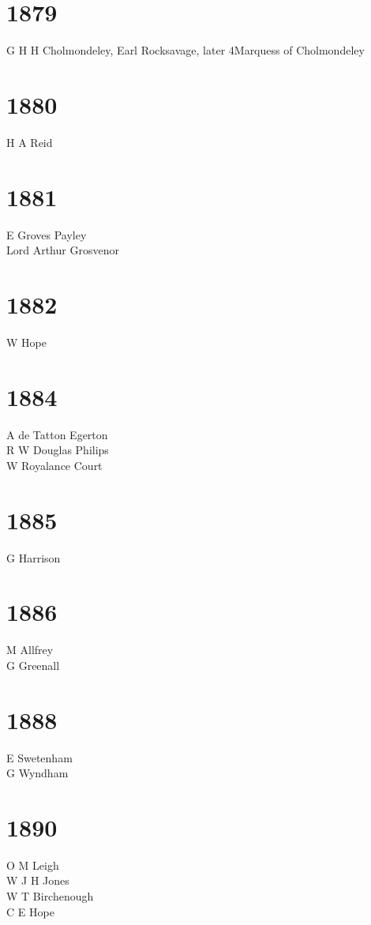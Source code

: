 \begin{multicols}{2}
  \section*{1879}
  G H H Cholmondeley, Earl Rocksavage, later 4\nth Marquess of Cholmondeley \\
  \section*{1880}
  H A Reid \\
  \section*{1881}
  E Groves Payley \\
  Lord Arthur Grosvenor \\
  \section*{1882}
  W Hope \\
  \section*{1884}
  A de Tatton Egerton \\
  R W Douglas Philips \\
  W Royalance Court \\
  \section*{1885}
  G Harrison \\
  \section*{1886}
  M Allfrey \\
  G Greenall \\
  \section*{1888}
  E Swetenham \\
  G Wyndham \\
  \section*{1890}
  O M Leigh \\
  W J H Jones \\
  W T Birchenough \\
  C E Hope \\

\end{multicols}
